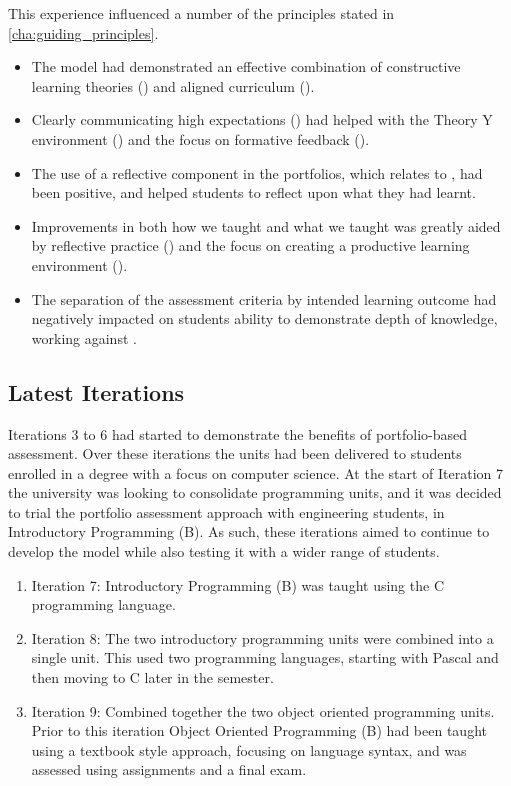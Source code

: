 This experience influenced a number of the principles stated in \cref{cha:guiding_principles}. 

\begin{itemize}[noitemsep,nolistsep]
	\item The model had demonstrated an effective combination of constructive learning theories () and aligned curriculum ().
	\item Clearly communicating high expectations () had helped with the Theory Y environment () and the focus on formative feedback ().
	\item The use of a reflective component in the portfolios, which relates to , had been positive, and helped students to reflect upon what they had learnt.
	\item Improvements in both how we taught and what we taught was greatly aided by reflective practice () and the focus on creating a productive learning environment ().
	\item The separation of the assessment criteria by intended learning outcome had negatively impacted on students ability to demonstrate depth of knowledge, working against .
\end{itemize}




\clearpage
\subsection{Latest Iterations} %
\label{sub:latest_iterations}

Iterations 3 to 6 had started to demonstrate the benefits of portfolio-based assessment. Over these iterations the units had been delivered to students enrolled in a degree with a focus on computer science. At the start of Iteration 7 the university was looking to consolidate programming units, and it was decided to trial the portfolio assessment approach with engineering students, in Introductory Programming (B). As such, these iterations aimed to continue to develop the model while also testing it with a wider range of students.

\begin{enumerate}
	\item Iteration 7: Introductory Programming (B) was taught using the C programming language.
	\item Iteration 8: The two introductory programming units were combined into a single unit. This used two programming languages, starting with Pascal and then moving to C later in the semester.
	\item Iteration 9: Combined together the two object oriented programming units. Prior to this iteration Object Oriented Programming (B) had been taught using a textbook style approach, focusing on language syntax, and was assessed using assignments and a final exam.
\end{enumerate}

